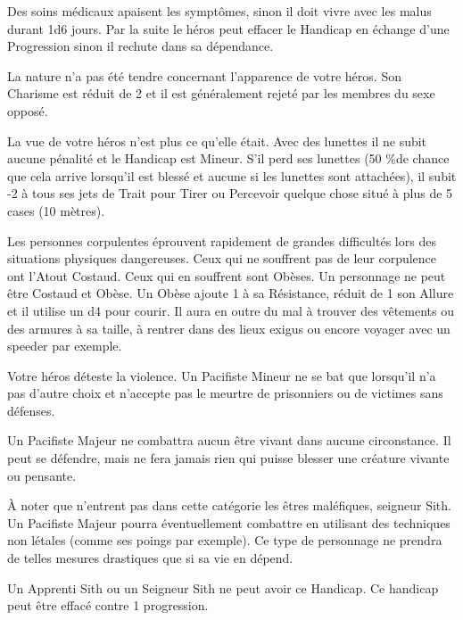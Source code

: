 \begin{description}[align=left]
        Des soins médicaux apaisent les symptômes, sinon il doit vivre avec les malus durant 1d6 jours. Par la suite le héros peut effacer le Handicap en échange d'une Progression sinon il rechute dans sa dépendance.

    \item [Moche (Mineur)]
        La nature n'a pas été tendre concernant l'apparence de votre héros. Son Charisme est réduit de 2 et il est généralement rejeté par les membres du sexe opposé.

    \item [Myope (Mineur)]
        La vue de votre héros n'est plus ce qu'elle était. Avec des lunettes il ne subit aucune pénalité et le Handicap est Mineur. S'il perd ses lunettes (50 \%de chance que cela arrive lorsqu'il est blessé et aucune si les lunettes sont attachées), il subit -2 à tous ses jets de Trait pour Tirer ou Percevoir quelque chose situé à plus de 5 cases (10 mètres).

    \item [Obèse (Mineur)]
        Les personnes corpulentes éprouvent rapidement de grandes difficultés lors des situations physiques dangereuses. Ceux qui ne souffrent pas de leur corpulence ont l'Atout Costaud. Ceux qui en souffrent sont Obèses. Un personnage ne peut être Costaud et Obèse. Un Obèse ajoute 1 à sa Résistance, réduit de 1 son Allure et il utilise un d4 pour courir. Il aura en outre du mal à trouver des vêtements ou des armures à sa taille, à rentrer dans des lieux exigus ou encore voyager avec un speeder par exemple.

    \item [Pacifiste (Mineur ou Majeur)]
        Votre héros déteste la violence. Un Pacifiste Mineur ne se bat que lorsqu'il n'a pas d'autre choix et n'accepte pas le meurtre de prisonniers ou de victimes sans défenses. 

        Un Pacifiste Majeur ne combattra aucun être vivant dans aucune circonstance. Il peut se défendre, mais ne fera jamais rien qui puisse blesser une créature vivante ou pensante. 

        À noter que n'entrent pas dans cette catégorie les êtres maléfiques, seigneur Sith. Un Pacifiste Majeur pourra éventuellement combattre en utilisant des techniques non létales (comme ses poings par exemple). Ce type de personnage ne prendra de telles mesures drastiques que si sa vie en dépend.

        Un Apprenti Sith ou un Seigneur Sith ne peut avoir ce Handicap. Ce handicap peut être effacé contre 1 progression.


\end{description}
